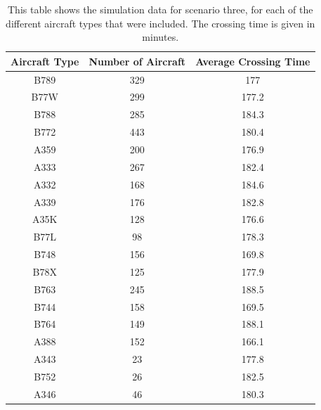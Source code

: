 \documentclass[stu, a4paper, 12pt, floatsintext]{apa7}
\numberwithin{figure}{section}
\numberwithin{table}{section}
\numberwithin{equation}{section}
\begin{document}
\begin{table}[H]
    \centering
    \caption{This table shows the simulation data for scenario three, for each of the different aircraft types that were included. The crossing time is given in minutes.}
    \label{tab:33}
    \begin{tabular}{@{}ccc@{}}
    \toprule
    \textbf{Aircraft Type} & \textbf{Number of Aircraft} & \textbf{Average Crossing Time} \\ \midrule
    B789                   & 329                         & 177                            \\
    B77W                   & 299                         & 177.2                          \\
    B788                   & 285                         & 184.3                          \\
    B772                   & 443                         & 180.4                          \\
    A359                   & 200                         & 176.9                          \\
    A333                   & 267                         & 182.4                          \\
    A332                   & 168                         & 184.6                          \\
    A339                   & 176                         & 182.8                          \\
    A35K                   & 128                         & 176.6                          \\
    B77L                   & 98                          & 178.3                          \\
    B748                   & 156                         & 169.8                          \\
    B78X                   & 125                         & 177.9                          \\
    B763                   & 245                         & 188.5                          \\
    B744                   & 158                         & 169.5                          \\
    B764                   & 149                         & 188.1                          \\
    A388                   & 152                         & 166.1                          \\
    A343                   & 23                          & 177.8                          \\
    B752                   & 26                          & 182.5                          \\
    A346                   & 46                          & 180.3                          \\ \bottomrule
    \end{tabular}
\end{table}
\end{document}
